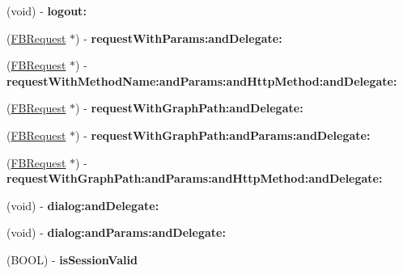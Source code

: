 \begin{DoxyCompactItemize}
\item 
\hypertarget{interface_facebook_a204f10894608b3e10943e15d9861c9be}{
(void) -\/ {\bfseries logout\-:}}
\label{interface_facebook_a204f10894608b3e10943e15d9861c9be}

\item 
\hypertarget{interface_facebook_abda41d7c75de5231b460869564a4148c}{
(\hyperlink{interface_f_b_request}{\-F\-B\-Request} $\ast$) -\/ {\bfseries request\-With\-Params\-:and\-Delegate\-:}}
\label{interface_facebook_abda41d7c75de5231b460869564a4148c}

\item 
\hypertarget{interface_facebook_abdd8888ceec0cc9641b3939345cb71bb}{
(\hyperlink{interface_f_b_request}{\-F\-B\-Request} $\ast$) -\/ {\bfseries request\-With\-Method\-Name\-:and\-Params\-:and\-Http\-Method\-:and\-Delegate\-:}}
\label{interface_facebook_abdd8888ceec0cc9641b3939345cb71bb}

\item 
\hypertarget{interface_facebook_ade34a729c134bba23ad8a432346a52b3}{
(\hyperlink{interface_f_b_request}{\-F\-B\-Request} $\ast$) -\/ {\bfseries request\-With\-Graph\-Path\-:and\-Delegate\-:}}
\label{interface_facebook_ade34a729c134bba23ad8a432346a52b3}

\item 
\hypertarget{interface_facebook_a01d3d35b70775982c37d68a53b911438}{
(\hyperlink{interface_f_b_request}{\-F\-B\-Request} $\ast$) -\/ {\bfseries request\-With\-Graph\-Path\-:and\-Params\-:and\-Delegate\-:}}
\label{interface_facebook_a01d3d35b70775982c37d68a53b911438}

\item 
\hypertarget{interface_facebook_a735024bca08b871be8fb5a7660ed56b5}{
(\hyperlink{interface_f_b_request}{\-F\-B\-Request} $\ast$) -\/ {\bfseries request\-With\-Graph\-Path\-:and\-Params\-:and\-Http\-Method\-:and\-Delegate\-:}}
\label{interface_facebook_a735024bca08b871be8fb5a7660ed56b5}

\item 
\hypertarget{interface_facebook_afb28ba8c9088bea131e780cbf7a34839}{
(void) -\/ {\bfseries dialog\-:and\-Delegate\-:}}
\label{interface_facebook_afb28ba8c9088bea131e780cbf7a34839}

\item 
\hypertarget{interface_facebook_a1912857d2083d698ee82dfe17346e6a4}{
(void) -\/ {\bfseries dialog\-:and\-Params\-:and\-Delegate\-:}}
\label{interface_facebook_a1912857d2083d698ee82dfe17346e6a4}

\item 
\hypertarget{interface_facebook_a6178476bc78da9727d4f2b32b9663a9a}{
(\-B\-O\-O\-L) -\/ {\bfseries is\-Session\-Valid}}
\label{interface_facebook_a6178476bc78da9727d4f2b32b9663a9a}


\end{DoxyCompactItemize}
